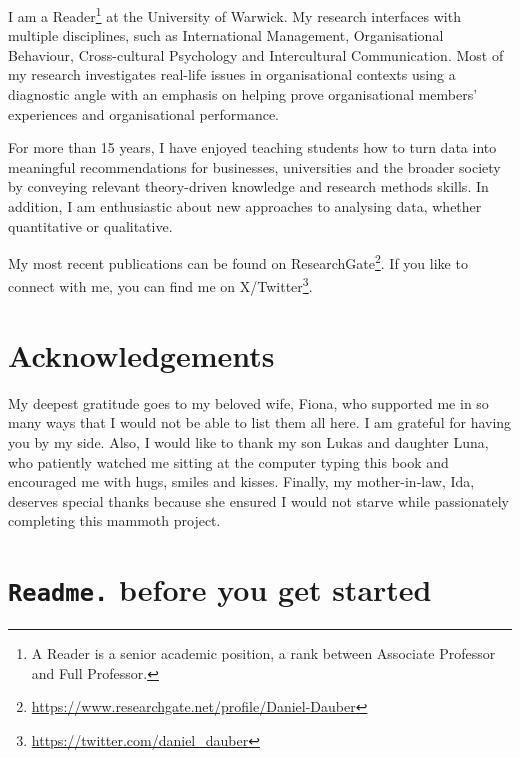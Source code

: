 \documentclass[
  letterpaper,
]{krantz}
\renewcommand{\href}[2]{#2\footnote{\url{#1}}}
\begin{document}

I am a Reader\footnote{A Reader is a senior academic position, a rank
  between Associate Professor and Full Professor.} at the University of
Warwick. My research interfaces with multiple disciplines, such as
International Management, Organisational Behaviour, Cross-cultural
Psychology and Intercultural Communication. Most of my research
investigates real-life issues in organisational contexts using a
diagnostic angle with an emphasis on helping prove organisational
members' experiences and organisational performance.

For more than 15 years, I have enjoyed teaching students how to turn
data into meaningful recommendations for businesses, universities and
the broader society by conveying relevant theory-driven knowledge and
research methods skills. In addition, I am enthusiastic about new
approaches to analysing data, whether quantitative or qualitative.

My most recent publications can be found on
\href{https://www.researchgate.net/profile/Daniel-Dauber}{ResearchGate}.
If you like to connect with me, you can find me on
\href{https://twitter.com/daniel_dauber}{X/Twitter}.


\chapter*{Acknowledgements}\label{sec-acknowledgements}


My deepest gratitude goes to my beloved wife, Fiona, who supported me in
so many ways that I would not be able to list them all here. I am
grateful for having you by my side. Also, I would like to thank my son
Lukas and daughter Luna, who patiently watched me sitting at the
computer typing this book and encouraged me with hugs, smiles and
kisses. Finally, my mother-in-law, Ida, deserves special thanks because
she ensured I would not starve while passionately completing this
mammoth project.


\chapter{\texorpdfstring{\texttt{Readme.} before you get
started}{Readme. before you get started}}\label{sec-readme-before-you-get-started}
\end{document}
